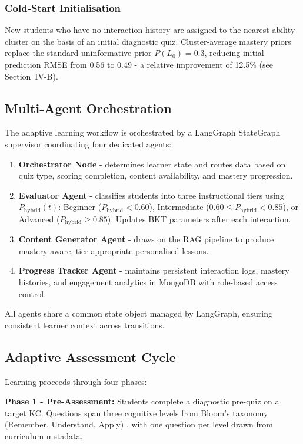 \documentclass[conference]{IEEEtran}
\begin{document}
\subsubsection{Cold-Start Initialisation}
New students who have no interaction history are assigned to the nearest ability cluster on the basis of an initial diagnostic quiz. Cluster-average mastery priors replace the standard uninformative prior $P(L_0) = 0.3$, reducing initial prediction RMSE from 0.56 to 0.49 - a relative improvement of 12.5\% (see Section~IV-B).

\subsection{Multi-Agent Orchestration}

The adaptive learning workflow is orchestrated by a LangGraph StateGraph supervisor coordinating four dedicated agents:

\begin{enumerate}
\item \textbf{Orchestrator Node} - determines learner state and routes data based on quiz type, scoring completion, content availability, and mastery progression.
\item \textbf{Evaluator Agent} - classifies students into three instructional tiers using $P_{\text{hybrid}}(t)$: Beginner ($P_{\text{hybrid}} < 0.60$), Intermediate ($0.60 \leq P_{\text{hybrid}} < 0.85$), or Advanced ($P_{\text{hybrid}} \geq 0.85$). Updates BKT parameters after each interaction.
\item \textbf{Content Generator Agent} - draws on the RAG pipeline to produce mastery-aware, tier-appropriate personalised lessons.
\item \textbf{Progress Tracker Agent} - maintains persistent interaction logs, mastery histories, and engagement analytics in MongoDB with role-based access control.
\end{enumerate}

All agents share a common state object managed by LangGraph, ensuring consistent learner context across transitions.

\subsection{Adaptive Assessment Cycle}

Learning proceeds through four phases:

\textbf{Phase 1 - Pre-Assessment:} Students complete a diagnostic pre-quiz on a target KC. Questions span three cognitive levels from Bloom's taxonomy (Remember, Understand, Apply) \cite{b35}, with one question per level drawn from curriculum metadata.
\end{document}
